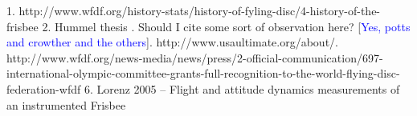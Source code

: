 \documentclass[a4paper,12pt, oneside]{article}
\newcommand{\blue}[1]{\textcolor{blue}{#1}}
\begin{document}
1. http://www.wfdf.org/history-stats/history-of-fyling-disc/4-history-of-the-frisbee
2. Hummel thesis . Should I cite some sort of observation here? [\blue{Yes, potts and crowther and the others}]. http://www.usaultimate.org/about/. http://www.wfdf.org/news-media/news/press/2-official-communication/697-international-olympic-committee-grants-full-recognition-to-the-world-flying-disc-federation-wfdf
6. Lorenz 2005 -- Flight and attitude dynamics measurements of an instrumented Frisbee 
\end{document}
